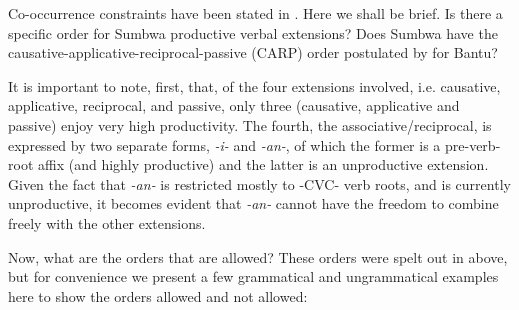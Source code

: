 \documentclass[output=paper		  ]{langscibook}
\begin{document}
{Co-occurrence constraints have been stated in . Here we shall be brief. Is there a specific order for Sumbwa productive verbal extensions? Does Sumbwa have the causative-applicative-reciprocal-passive (CARP) order postulated by \citet{Hyman2002} for Bantu?}

{It is important to note, first, that, of the four extensions involved, i.e. causative, applicative, reciprocal, and passive, only three (causative, applicative and passive) enjoy very high productivity. The fourth, the associative/reciprocal, is expressed by two separate forms,} {\textit{{}-i-}} {and} {\textit{{}-an-}}{, of which the former is a pre-verb-root affix (and highly productive) and the latter is an unproductive extension. Given the fact that} {\textit{{}-an-}} {is restricted mostly to -CVC- verb roots, and is currently unproductive, it becomes evident that} {\textit{{}-an-}} {cannot have the freedom to combine freely with the other extensions.}

{Now, what are the orders that are allowed? These orders were spelt out in  above, but for convenience we present a few grammatical and ungrammatical examples here to show the orders allowed and not allowed:}

\ea\label{ex:kahigi:63}
    \label{ex:kahigi:63a}

    \label{ex:kahigi:63b}

    \label{ex:kahigi:63c}

    \label{ex:kahigi:63d}

    \label{ex:kahigi:63e}
\end{document}
